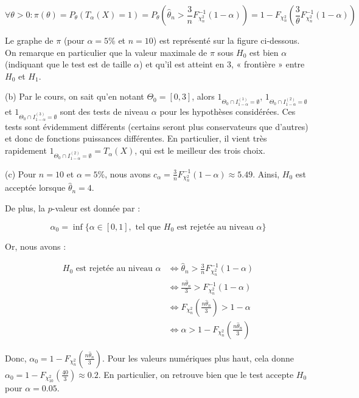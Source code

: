 {\begin{enumerate}
{\[
\forall \theta > 0 : \pi(\theta) = P_{\theta}(T_{\alpha}(X) = 1) = P_{\theta}\left(\hat{\theta}_n > \frac{3}{n} F^{-1}_{\chi^2_n}(1 - \alpha)\right) = 1 - F_{\chi^2_n}\left(\frac{3}{\theta} F^{-1}_{\chi^2_n}(1 - \alpha)\right)
\]

Le graphe de $\pi$ (pour $\alpha = 5\%$ et $n = 10$) est représenté sur la figure ci-dessous. On remarque en particulier que la valeur maximale de $\pi$ sous $H_0$ est bien $\alpha$ (indiquant que le test est de taille $\alpha$) et qu'il est atteint en $3$, « frontière » entre $H_0$ et $H_1$.

(b) Par le cours, on sait qu'en notant $\Theta_0 = [0, 3]$, alors $1_{\Theta_0 \cap I^{(1)}_{1-\alpha} = \emptyset}$, $1_{\Theta_0 \cap I^{(2)}_{1-\alpha} = \emptyset}$ et $1_{\Theta_0 \cap I^{(3)}_{1-\alpha} = \emptyset}$ sont des tests de niveau $\alpha$ pour les hypothèses considérées. Ces tests sont évidemment différents (certains seront plus conservateurs que d'autres) et donc de fonctions puissances différentes. En particulier, il vient très rapidement $1_{\Theta_0 \cap I^{(2)}_{1-\alpha} = \emptyset} = T_{\alpha}(X)$, qui est le meilleur des trois choix.

(c) Pour $n = 10$ et $\alpha = 5\%$, nous avons $c_{\alpha} = \frac{3}{n} F^{-1}_{\chi^2_n}(1 - \alpha) \approx 5.49$. Ainsi, $H_0$ est acceptée lorsque $\hat{\theta}_n = 4$.

De plus, la $p$-valeur est donnée par :

\[
\alpha_0 = \inf \{\alpha \in [0, 1], \text{ tel que } H_0 \text{ est rejetée au niveau } \alpha\}
\]

Or, nous avons :

\begin{align*}
H_0 \text{ est rejetée au niveau } \alpha &\Leftrightarrow \hat{\theta}_n > \frac{3}{n} F^{-1}_{\chi^2_n}(1 - \alpha) \\
&\Leftrightarrow \frac{n \hat{\theta}_n}{3} > F^{-1}_{\chi^2_n}(1 - \alpha) \\
&\Leftrightarrow F_{\chi^2_n}\left(\frac{n \hat{\theta}_n}{3}\right) > 1 - \alpha \\
&\Leftrightarrow \alpha > 1 - F_{\chi^2_n}\left(\frac{n \hat{\theta}_n}{3}\right)
\end{align*}

Donc, $\alpha_0 = 1 - F_{\chi^2_n}\left(\frac{n \hat{\theta}_n}{3}\right)$. Pour les valeurs numériques plus haut, cela donne $\alpha_0 = 1 - F_{\chi^2_{10}}\left(\frac{40}{3}\right) \approx 0.2$. En particulier, on retrouve bien que le test accepte $H_0$ pour $\alpha = 0.05$.
}
\end{enumerate}

}
